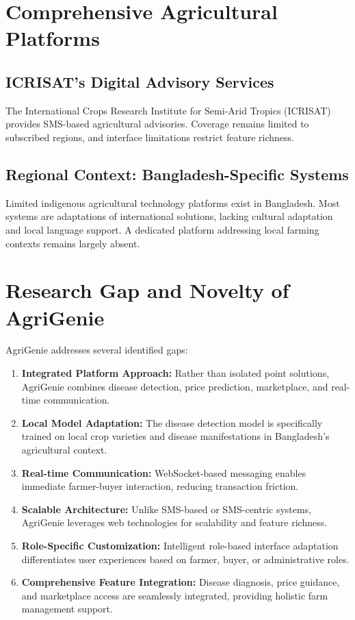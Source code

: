 \documentclass[12pt,a4paper]{report}
\begin{document}
\section{Comprehensive Agricultural Platforms}

\subsection{ICRISAT's Digital Advisory Services}

The International Crops Research Institute for Semi-Arid Tropics (ICRISAT) provides SMS-based agricultural advisories. Coverage remains limited to subscribed regions, and interface limitations restrict feature richness.

\subsection{Regional Context: Bangladesh-Specific Systems}

Limited indigenous agricultural technology platforms exist in Bangladesh. Most systems are adaptations of international solutions, lacking cultural adaptation and local language support. A dedicated platform addressing local farming contexts remains largely absent.

\section{Research Gap and Novelty of AgriGenie}

AgriGenie addresses several identified gaps:

\begin{enumerate}
    \item \textbf{Integrated Platform Approach:} Rather than isolated point solutions, AgriGenie combines disease detection, price prediction, marketplace, and real-time communication.
    
    \item \textbf{Local Model Adaptation:} The disease detection model is specifically trained on local crop varieties and disease manifestations in Bangladesh's agricultural context.
    
    \item \textbf{Real-time Communication:} WebSocket-based messaging enables immediate farmer-buyer interaction, reducing transaction friction.
    
    \item \textbf{Scalable Architecture:} Unlike SMS-based or SMS-centric systems, AgriGenie leverages web technologies for scalability and feature richness.
    
    \item \textbf{Role-Specific Customization:} Intelligent role-based interface adaptation differentiates user experiences based on farmer, buyer, or administrative roles.
    
    \item \textbf{Comprehensive Feature Integration:} Disease diagnosis, price guidance, and marketplace access are seamlessly integrated, providing holistic farm management support.
\end{enumerate}
\end{document}
